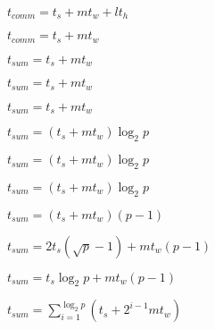 \documentclass[10pt]{book}
\begin{document}
\begin{mdSnippets}
\begin{mdInlineSnippet}%
$t_{comm} = t_s + mt_w+ lt_h$\end{mdInlineSnippet}%
\begin{mdInlineSnippet}%
$t_{comm} = t_s + mt_w$\end{mdInlineSnippet}%
\begin{mdInlineSnippet}[10819d45a6f11b738122f5fb8de9b0d8]%
$t_{sum} = t_s + mt_w$\end{mdInlineSnippet}%
\begin{mdInlineSnippet}[10819d45a6f11b738122f5fb8de9b0d8]%
$t_{sum} = t_s + mt_w$\end{mdInlineSnippet}%
\begin{mdInlineSnippet}[10819d45a6f11b738122f5fb8de9b0d8]%
$t_{sum} = t_s + mt_w$\end{mdInlineSnippet}%
\begin{mdInlineSnippet}%
$t_{sum} = (t_s + mt_w) \log _2 p$\end{mdInlineSnippet}%
\begin{mdInlineSnippet}%
$t_{sum} = (t_s + mt_w) \log _2 p$\end{mdInlineSnippet}%
\begin{mdInlineSnippet}%
$t_{sum} = (t_s + mt_w) \log _2 p$\end{mdInlineSnippet}%
\begin{mdInlineSnippet}[76ecbdcc60db753d50e0f54442684a1f]%
$t_{sum} = (t_s + mt_w)(p - 1)$\end{mdInlineSnippet}%
\begin{mdInlineSnippet}[9f1e04740609c172e554c5544a2e4175]%
$t_{sum} = 2t_s(\sqrt {p} - 1) + mt_w(p  - 1)$\end{mdInlineSnippet}%
\begin{mdInlineSnippet}[d0200a7499f424eef524040c317cc427]%
$t_{sum} = t_s{\log _2 p} + mt_w(p - 1)$\end{mdInlineSnippet}%
\begin{mdInlineSnippet}[67acc216d9d37e9e45c7df86f83a6986]%
$t_{sum} = \sum^{\log _2 p}_{i = 1}{(t_s + 2^{i - 1}m{t_w})}$\end{mdInlineSnippet}%

\end{mdSnippets}
\end{document}
